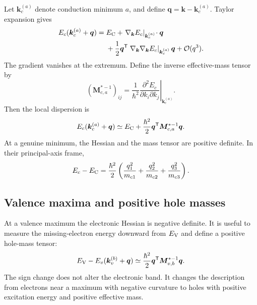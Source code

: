 Let $\bm k_c^{(a)}$ denote conduction minimum $a$, and define
$\bm q=\bm k-\bm k_c^{(a)}$.  Taylor expansion gives
\begin{equation}
\begin{aligned}
  E_c(\bm k_c^{(a)}+\bm q)
  ={}&E_{\mathrm C}
  +\left.\nabla_{\bm k}E_c\right|_{\bm k_c^{(a)}}\!\cdot\bm q\\
  &+\frac12\bm q^{\mathsf T}
    \left.\nabla_{\bm k}\nabla_{\bm k}E_c\right|_{\bm k_c^{(a)}}
    \bm q
  +\mathcal O(q^3).
\end{aligned}
  \label{eq:conduction-taylor-expansion}
\end{equation}
The gradient vanishes at the extremum.  Define the inverse effective-mass
tensor by
\begin{equation}
  \left(\bm M_{c,a}^{*-1}\right)_{ij}
  =\frac{1}{\hbar^2}
    \left.
    \frac{\partial^2E_c}{\partial k_i\partial k_j}
    \right|_{\bm k_c^{(a)}}.
  \label{eq:conduction-inverse-effective-mass}
\end{equation}
Then the local dispersion is
\begin{equation}
  E_c(\bm k_c^{(a)}+\bm q)
  \simeq
  E_{\mathrm C}+\frac{\hbar^2}{2}
  \bm q^{\mathsf T}\bm M_{c,a}^{*-1}\bm q.
  \label{eq:conduction-parabolic-band}
\end{equation}
At a genuine minimum, the Hessian and the mass tensor are positive definite.
In their principal-axis frame,
\begin{equation}
  E_c-E_{\mathrm C}
  =\frac{\hbar^2}{2}
  \left(
    \frac{q_1^2}{m_{c1}}
   +\frac{q_2^2}{m_{c2}}
   +\frac{q_3^2}{m_{c3}}
  \right).
  \label{eq:conduction-principal-masses}
\end{equation}

\subsection{Valence maxima and positive hole masses}

At a valence maximum the electronic Hessian is negative definite.  It is useful
to measure the missing-electron energy downward from $E_{\mathrm V}$ and define a
positive hole-mass tensor:
\begin{equation}
  E_{\mathrm V}-E_v(\bm k_v^{(b)}+\bm q)
  \simeq
  \frac{\hbar^2}{2}
  \bm q^{\mathsf T}\bm M_{v,b}^{*-1}\bm q.
  \label{eq:valence-parabolic-band}
\end{equation}
The sign change does not alter the electronic band.  It changes the description
from electrons near a maximum with negative curvature to holes with positive
excitation energy and positive effective mass.

